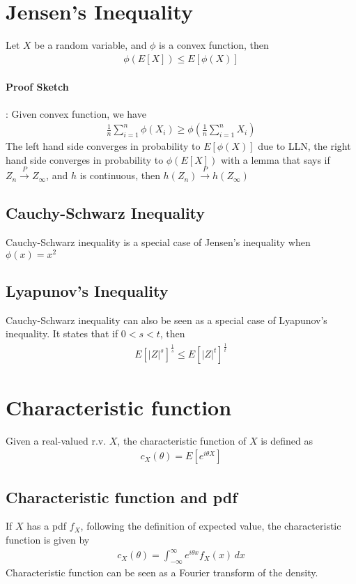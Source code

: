 \section{Jensen's Inequality} 
Let $X$ be a random variable, and $\phi$ is a convex function, then 
    \begin{align*}
        \phi(E[X]) \leq E[\phi(X)]
    \end{align*}
\paragraph{Proof Sketch}: Given convex function, we have 
    \begin{align*}
        \frac{1}{n} \sum_{i=1}^n \phi(X_i) \geq \phi(\frac{1}{n} \sum_{i=1}^n X_i)
    \end{align*}
The left hand side converges in probability to $E[\phi(X)]$ due to LLN, the right hand side converges in probability to $\phi(E[X])$ with a lemma that says if $Z_n \overset{P}{\to} Z_\infty$, and $h$ is continuous, then $h(Z_n) \overset{P}{\to} h(Z_\infty)$

\subsection{Cauchy-Schwarz Inequality}
Cauchy-Schwarz inequality is a special case of Jensen's inequality when $\phi(x) = x^2$

\subsection{Lyapunov's Inequality}
Cauchy-Schwarz inequality can also be seen as a special case of Lyapunov's inequality. It states that if $0 < s < t$, then 
    \begin{align*}
        E[|Z|^s]^{\frac{1}{s}} \leq E[|Z|^t]^{\frac{1}{t}}
    \end{align*}



\section{Characteristic function}
Given a real-valued r.v. $X$, the characteristic function of $X$ is defined as 
    \begin{align*}
        c_X(\theta) = E[e^{i \theta X}]
    \end{align*}

\subsection{Characteristic function and pdf}
If $X$ has a pdf $f_X$, following the definition of expected value, the characteristic function is given by 
    \begin{align*}
        c_X(\theta) = \int_{-\infty}^\infty e^{i \theta x}f_X(x) \, dx
    \end{align*}
Characteristic function can be seen as a Fourier transform of the density. 


